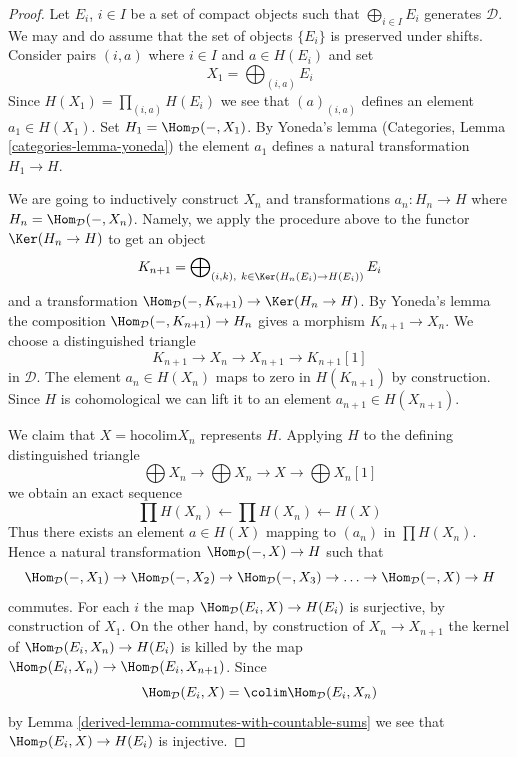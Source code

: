 \begin{proof}

Let $E_i$, $i \in I$ be a set of compact objects such that
$\bigoplus_{i \in I} E_i$ generates $\mathcal{D}$. We may and do assume
that the set of objects $\{E_i\}$ is preserved under shifts. Consider pairs
$(i, a)$ where $i \in I$ and $a \in H(E_i)$ and set
$$
X_1 = \bigoplus\nolimits_{(i, a)} E_i
$$
Since $H(X_1) = \prod_{(i, a)} H(E_i)$ we see that $(a)_{(i, a)}$
defines an element $a_1 \in H(X_1)$. Set $H_1 = \Hom_\mathcal{D}(- , X_1)$.
By Yoneda's lemma (Categories, Lemma \ref{categories-lemma-yoneda})
the element $a_1$ defines a natural transformation $H_1 \to H$.

\medskip\noindent
We are going to inductively construct $X_n$ and transformations
$a_n : H_n \to H$ where $H_n = \Hom_\mathcal{D}(-, X_n)$.
Namely, we apply the procedure
above to the functor $\Ker(H_n \to H)$ to get an object
$$
K_{n + 1} = \bigoplus\nolimits_{(i, k),\ k \in \Ker(H_n(E_i) \to H(E_i))} E_i
$$
and a transformation $\Hom_\mathcal{D}(-, K_{n + 1}) \to \Ker(H_n \to H)$.
By Yoneda's lemma the composition $\Hom_\mathcal{D}(-, K_{n + 1}) \to H_n$
gives a morphism $K_{n + 1} \to X_n$. We choose
a distinguished triangle
$$
K_{n + 1} \to X_n \to X_{n + 1} \to K_{n + 1}[1]
$$
in $\mathcal{D}$. The element $a_n \in H(X_n)$ maps to zero
in $H(K_{n + 1})$ by construction. Since $H$ is cohomological
we can lift it to an element $a_{n + 1} \in H(X_{n + 1})$.

\medskip\noindent
We claim that $X = \text{hocolim} X_n$ represents $H$. Applying $H$
to the defining distinguished triangle
$$
\bigoplus X_n \to
\bigoplus X_n \to X \to
\bigoplus X_n[1]
$$
we obtain an exact sequence
$$
\prod H(X_n) \leftarrow
\prod H(X_n) \leftarrow
H(X)
$$
Thus there exists an element $a \in H(X)$ mapping to $(a_n)$
in $\prod H(X_n)$. Hence a natural transformation
$\Hom_\mathcal{D}(- , X) \to H$ such that
$$
\Hom_\mathcal{D}(-, X_1) \to
\Hom_\mathcal{D}(-, X_2) \to
\Hom_\mathcal{D}(-, X_3) \to \ldots \to
\Hom_\mathcal{D}(-, X) \to H
$$
commutes. For each $i$ the map $\Hom_\mathcal{D}(E_i, X) \to H(E_i)$
is surjective, by construction of $X_1$. On the other hand, by construction
of $X_n \to X_{n + 1}$ the kernel of $\Hom_\mathcal{D}(E_i, X_n) \to H(E_i)$
is killed by the map
$\Hom_\mathcal{D}(E_i, X_n) \to \Hom_\mathcal{D}(E_i, X_{n + 1})$.
Since
$$
\Hom_\mathcal{D}(E_i, X) = \colim \Hom_\mathcal{D}(E_i, X_n)
$$
by Lemma \ref{derived-lemma-commutes-with-countable-sums}
we see that $\Hom_\mathcal{D}(E_i, X) \to H(E_i)$ is injective.


\end{proof}
